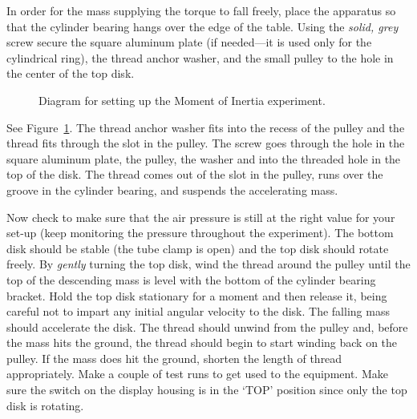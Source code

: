 In order for the mass supplying the torque to fall freely, place the apparatus
so that the cylinder bearing hangs over the edge of the table.
Using the {\em solid, grey} screw secure the square aluminum plate
(if needed---it is used only for the cylindrical ring), the thread
anchor washer, and the small pulley to the hole in the center of the top disk.
\begin{figure}[!hbt]
\begin{center}
{}
\end{center}
\caption{Diagram for setting up the Moment of Inertia experiment.
  \label{fig:rot2}}
\end{figure}
See Figure~\ref{fig:rot2}.  The thread anchor washer fits into the recess of
the pulley and the thread fits through the slot in the pulley.  The screw goes
through the hole in the square aluminum plate, the pulley, the washer and into
the threaded hole in the top of the disk.  The thread comes out of the slot in
the pulley, runs over the groove in the cylinder bearing, and suspends the
accelerating mass.

Now check to make sure that the air pressure is still at the right value for
your set-up (keep
monitoring the pressure throughout the experiment).  The bottom disk should be
stable (the tube clamp is open) and the top disk should rotate freely.  By
{\em gently} turning the top disk, wind the thread around the pulley until the
top of the descending mass is level with the bottom of the cylinder
bearing
bracket.  Hold the top disk stationary for a moment and then release it, being
careful not to impart any initial angular velocity to the disk.  The falling
mass should accelerate the disk.  The thread should unwind from the pulley
and, before the mass hits the ground, the thread should begin to start winding
back on the pulley.  If the mass does hit the ground, shorten the length of
thread appropriately.  Make a couple of test runs to get used
to the equipment.  Make sure the switch on the display housing is in the `TOP'
position since only the top disk is rotating.

